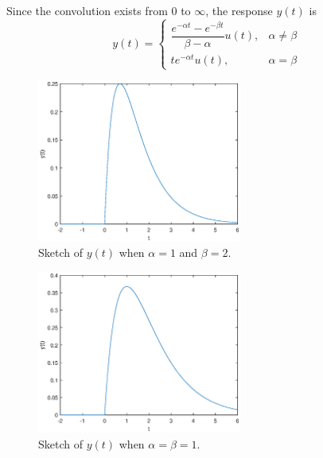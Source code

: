 \documentclass[a4paper]{article}
\begin{document}
Since the convolution exists from 0 to $\infty$, the response $y(t)$ is
\[\boxed{y(t)=
    \begin{cases}
        \dfrac{e^{-\alpha t}-e^{-\beta t}}{\beta-\alpha}u(t),&\alpha\neq\beta\\
        te^{-\alpha t}u(t),&\alpha=\beta
    \end{cases}}
\]
\begin{figure}[H]
    \begin{center}
        \includegraphics[width=0.6\textwidth]{5(a)-1.eps}
    \end{center}
    \caption{Sketch of $y(t)$ when $\alpha=1$ and $\beta=2$.}
\end{figure}
\begin{figure}[H]
    \begin{center}
        \includegraphics[width=0.6\textwidth]{5(a)-2.eps}
    \end{center}
    \caption{Sketch of $y(t)$ when $\alpha=\beta=1$.}
\end{figure}
\end{document}
